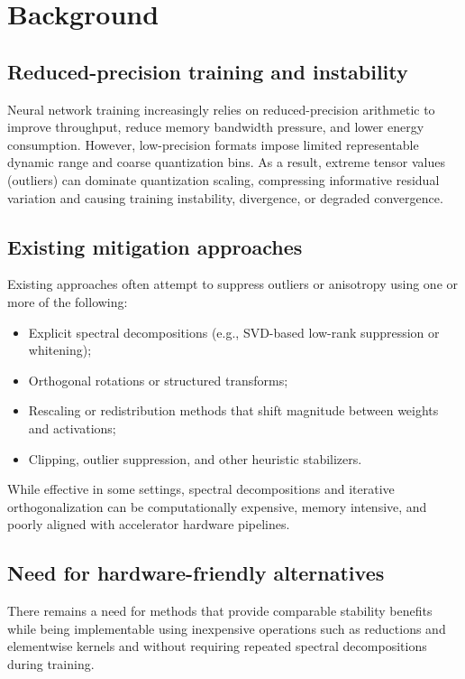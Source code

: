 \documentclass[11pt]{article}
\begin{document}
\section{Background}
\subsection{Reduced-precision training and instability}
Neural network training increasingly relies on reduced-precision arithmetic to improve throughput, reduce memory bandwidth pressure, and lower energy consumption. However, low-precision formats impose limited representable dynamic range and coarse quantization bins. As a result, extreme tensor values (outliers) can dominate quantization scaling, compressing informative residual variation and causing training instability, divergence, or degraded convergence.

\subsection{Existing mitigation approaches}
Existing approaches often attempt to suppress outliers or anisotropy using one or more of the following:
\begin{itemize}[leftmargin=1.2em]
\item Explicit spectral decompositions (e.g., SVD-based low-rank suppression or whitening);
\item Orthogonal rotations or structured transforms;
\item Rescaling or redistribution methods that shift magnitude between weights and activations;
\item Clipping, outlier suppression, and other heuristic stabilizers.
\end{itemize}
While effective in some settings, spectral decompositions and iterative orthogonalization can be computationally expensive, memory intensive, and poorly aligned with accelerator hardware pipelines.

\subsection{Need for hardware-friendly alternatives}
There remains a need for methods that provide comparable stability benefits while being implementable using inexpensive operations such as reductions and elementwise kernels and without requiring repeated spectral decompositions during training.
\end{document}
